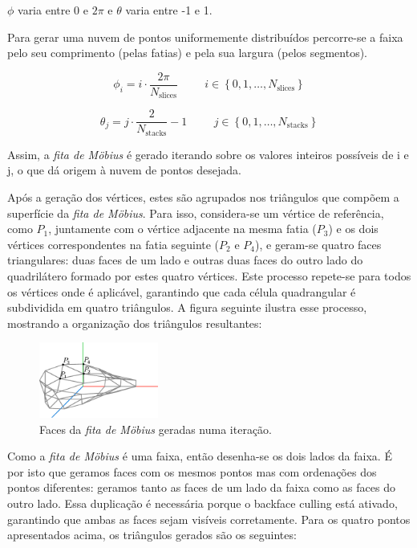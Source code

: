 \documentclass[12pt, a4paper]{article}
\begin{document}
$\phi$ varia entre 0 e $2 \pi$ e $\theta$ varia entre -1 e 1.

Para gerar uma nuvem de pontos uniformemente distribuídos percorre-se a faixa pelo seu comprimento
(pelas fatias) e pela sua largura (pelos segmentos).

$$
\phi_i = i \cdot \frac{2\pi}{N_\text{slices}}
\hspace{1cm}
i \in \left \lbrace 0, 1, \ldots, N_\text{slices} \right \rbrace
$$

$$
\theta_j = j \cdot \frac{2}{N_\text{stacks}} -1
\hspace{1cm}
j \in \left \lbrace 0, 1, \ldots, N_\text{stacks} \right \rbrace
$$

Assim, a \emph{fita de Möbius} é gerado iterando sobre os valores inteiros possíveis de i e j,
o que dá origem à nuvem de pontos desejada.

Após a geração dos vértices, estes são agrupados nos triângulos que compõem a superfície da
\emph{fita de Möbius}.
Para isso, considera-se um vértice de referência, como $P_1$, juntamente com o vértice
adjacente na mesma fatia ($P_3$) e os dois vértices correspondentes na fatia seguinte
($P_2$ e $P_4$), e geram-se quatro faces triangulares: duas faces de um lado e outras duas
faces do outro lado do quadrilátero formado por estes quatro vértices. Este processo
repete-se para todos os vértices onde é aplicável, garantindo que cada célula quadrangular
é subdividida em quatro triângulos. A figura seguinte ilustra esse processo, mostrando
a organização dos triângulos resultantes:

\begin{figure}[H]
    \centering
    \includegraphics[width=0.35\textwidth]{res/phase2/figures/MobiusStrip.pdf}
    \caption{Faces da \emph{fita de Möbius} geradas numa iteração.}
\end{figure}

Como a \emph{fita de Möbius} é uma faixa, então desenha-se os dois lados da faixa. É por
isto que geramos faces com os mesmos pontos mas com ordenações dos pontos diferentes:
geramos tanto as faces de um lado da faixa como as faces do outro lado. Essa duplicação é
necessária porque o backface culling está ativado, garantindo que ambas as faces sejam
visíveis corretamente. Para os quatro pontos apresentados acima, os triângulos gerados
são os seguintes:
\end{document}
